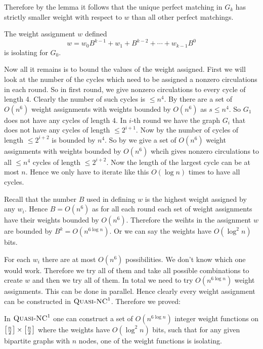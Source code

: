 Therefore by the lemma it follows that the unique perfect matching in $G_k$ has strictly smaller weight with respect to $w$ than all other perfect matchings.
\begin{corolary}{}{}
	The weight assignment $w$ defined  $$w=w_0B^{k-1}+w_1+B^{k-2}+\cdots +w_{k-1}B^0$$ is isolating for $G_0$.
\end{corolary}

Now all it remains is to bound the values of the weight assigned. First we will look at the number of the cycles which need to be assigned a nonzero circulations in each round. So in first round, we give nonzero circulations to every cycle of length 4. Clearly the number of such cycles is $\leq n^4$. By  there are a set of $O(n^6)$ weight assignments with weights bounded by $O(n^6)$ as $s\leq n^4$. So $G_1$ does not have any cycles of length $4$. In $i$-th round we have the graph $G_i$ that does not have any cycles of length $\leq 2^{i+1}$. Now by  the number of cycles of length $\leq 2^{i+2}$ is bounded by $n^4$. So by  we give a set of $O(n^6)$ weight assignments with weights bounded by $O(n^6)$ whcih gives nonzero circulations to all $\leq n^4$ cycles of length $\leq 2^{i+2}$. Now the length of the largest cycle can be at most $n$. Hence we only have to iterate like this $O(\log n)$ times to have all cycles.

Recall that the number $B$ used in defining $w$ is the highest weight assigned by any $w_i$. Hence $B=O(n^6)$ as for all each round each set of weight assignments have their weights bounded by $O(n^6)$. Therefore the weihts in the assignment $w$ are bounded by $B^k=O(n^{6\log n})$. Or we can say the weights have $O(\log^2n)$ bits.

For each $w_i$ there are at most $O(n^6)$ possibilities. We don't know which one would work. Therefore we try all of them and take all possible combinations to create $w$ and then we try all of them. In total we need to try $O(n^{6\log n})$ weight assignments. This can be done in parallel. Hence clearly every weight assignment can be constructed in $\textsc{Quasi-NC}^1$. Therefore we proved:
\begin{Theorem}{\cite[Lemma 3.7]{FennerGurjarThierauf_2016_Bpm_CONF}}{}
In $\textsc{Quasi-NC}^1$ one can construct a set of $O(n^{6\log n})$ integer weight functions on $\left[\frac{n}{2}\right]\times \left[\frac{n}2\right]$ where the weights have $O(\log ^2 n)$ bits, such that for any given bipartite graphs with $n$ nodes, one of the weight functions is isolating.
\end{Theorem}

